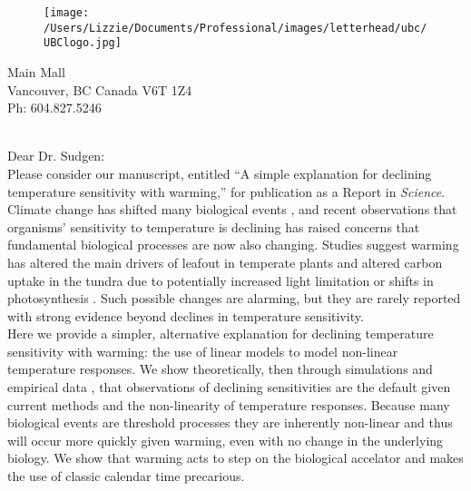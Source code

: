 \documentclass[11pt,a4paper]{article}
\begin{document}

\begin{figure}[htbp]
\hspace*{14cm}                                                           
\texttt{[image: /Users/Lizzie/Documents/Professional/images/letterhead/ubc/UBClogo.jpg]}
\end{figure}
\vspace{-10ex}
\begin{small}
 Main Mall \\
\noindent Vancouver, BC Canada V6T 1Z4\\
\noindent Ph: 604.827.5246\\
\end{small}
\vspace{2ex}\\
\noindent Dear Dr. Sudgen:
\vspace{1.5ex}\\
Please consider our manuscript, entitled ``A simple explanation for declining temperature sensitivity with warming,'' for publication as a Report in \emph{Science}. 
\vspace{1.5ex}\\
Climate change has shifted many biological events \citep{IPCC:2014sm}, and recent observations that organisms' sensitivity to temperature is declining has raised concerns that fundamental biological processes are now also changing. Studies suggest warming has altered the main drivers of leafout in temperate plants \citep{fu2015,gusewell2017,Samplonius:2018aa,vitasse2018} and altered carbon uptake in the tundra due to potentially increased light limitation or shifts in photosynthesis \citep{piao2017,Zhu2019}. Such possible changes are alarming, but they are rarely reported with strong evidence beyond declines in temperature sensitivity.
\vspace{1.5ex}\\
Here we provide a simpler, alternative explanation for declining temperature sensitivity with warming: the use of linear models to model non-linear temperature responses. We show theoretically, then through simulations and empirical data \citep[using the same datatset used in][]{fu2015}, that observations of declining sensitivities are the default given current methods and the non-linearity of temperature responses. Because many biological events are threshold processes they are inherently non-linear and thus will occur more quickly given warming, even with no change in the underlying biology. We show that warming acts to step on the biological accelator and makes the use of classic calendar time precarious. 
\end{document}
